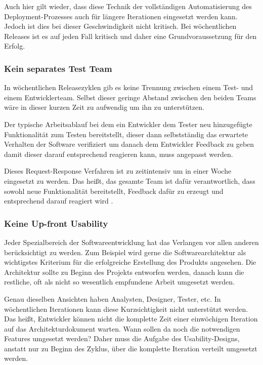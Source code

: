 Auch hier gilt wieder, dass diese Technik der vollständigen Automatisierung des Deployment-Prozesses auch für längere Iterationen eingesetzt werden kann. Jedoch ist dies bei dieser Geschwindigkeit nicht kritisch. Bei wöchentlichen Releases ist es auf jeden Fall kritisch und daher eine Grundvoraussetzung für den Erfolg.

\subsubsection{Kein separates Test Team}
In wöchentlichen Releasezyklen gib es keine Trennung zwischen einem Test- und einem Entwicklerteam. Selbst dieser geringe Abstand zwischen den beiden Teams wäre in dieser kurzen Zeit zu aufwendig um ihn zu unterstützen. 

Der typische Arbeitsablauf bei dem ein Entwickler dem Tester neu hinzugefügte Funktionalität zum Testen bereitstellt, dieser dann selbstständig das erwartete Verhalten der Software verifiziert um danach dem Entwickler Feedback zu geben damit dieser darauf entsprechend reagieren kann, muss angepasst werden. 

Dieses Request-Response Verfahren ist zu zeitintensiv um in einer Woche eingesetzt zu werden. Das heißt, das gesamte Team ist dafür verantwortlich, dass sowohl neue Funktionalität bereitstellt, Feedback dafür zu erzeugt und entsprechend darauf reagiert wird \cite{crispin2008}.

\subsubsection{Keine Up-front Usability}
Jeder Spezialbereich der Softwareentwicklung hat das Verlangen vor allen anderen berücksichtigt zu werden. Zum Beispiel wird gerne die Softwarearchitektur als wichtigstes Kriterium für die erfolgreiche Erstellung des Produkts angesehen. Die Architektur sollte zu Beginn des Projekts entworfen werden, danach kann die restliche, oft als nicht so wesentlich empfundene Arbeit umgesetzt werden. 

Genau dieselben Ansichten haben Analysten, Designer, Tester, etc. In wöchentlichen Iterationen kann diese Kurzsichtigkeit nicht unterstützt werden. Das heißt, Entwickler können nicht die komplette Zeit einer einwöchigen Iteration auf das Architekturdokument warten. Wann sollen da noch die notwendigen Features umgesetzt werden? 
Daher muss die Aufgabe des Usability-Designs, anstatt nur zu Beginn des Zyklus, über die komplette Iteration verteilt umgesetzt werden.

